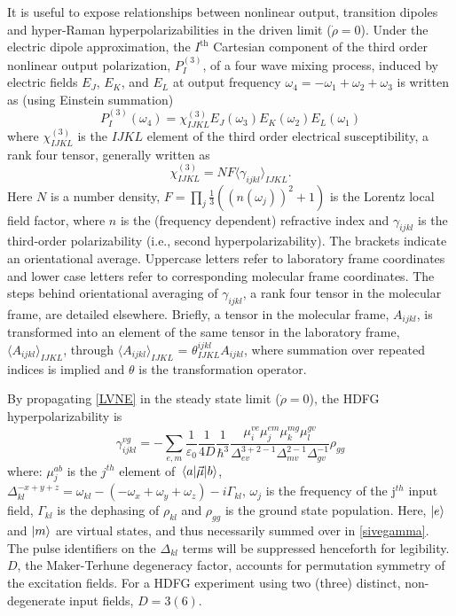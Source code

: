 \documentclass[aip, jcp, reprint, onecolumn, nofootinbib]{revtex4-2}
\begin{document}
It is useful to expose relationships between nonlinear output, transition dipoles and hyper-Raman hyperpolarizabilities in the driven limit ($\dot{\rho} = 0$). \cite{Simpson2004, Moad2005}
Under the electric dipole approximation, the $I^\text{th}$ Cartesian component of the third order nonlinear output polarization, ${P}^{(3)}_I$, of a four wave mixing process, induced by electric fields $E_J$, $E_K$, and $E_L$ at output frequency $\omega_4=-\omega_1 + \omega_2 + \omega_3$ is written as (using Einstein summation) \cite{RN307}
\begin{equation} \label{polarization}
{P}^{(3)}_I (\omega_4)  = \chi^{(3)}_{IJKL} E_J(\omega_3) E_K(\omega_2) E_L(\omega_1) 
\end{equation}
where $\chi^{(3)}_{IJKL}$ is the $IJKL$ element of the third order electrical susceptibility, a rank four tensor, generally written as
\begin{equation}\label{eq:nfgamma}
	\chi^{(3)}_{IJKL} = NF \langle \gamma_{ijkl} \rangle_{IJKL}.
\end{equation}
Here $N$ is a number density, $F=\prod_j  \frac{1}{3} \left({\left(n(\omega_j)\right)^2 + 1} \right)$ is the Lorentz local field factor, where $n$ is the (frequency dependent) refractive index and $\gamma_{ijkl}$ is the third-order polarizability (i.e., second hyperpolarizability). \cite{Bedeaux1973}
The brackets indicate an orientational average.\cite{Andrews1977}
Uppercase letters refer to laboratory frame coordinates and lower case letters refer to corresponding molecular frame coordinates.
The steps behind orientational averaging of $\gamma_{ijkl}$, a rank four tensor in the molecular frame, are detailed elsewhere.\cite{Andrews1977, McDonnell2024}
Briefly, a tensor in the molecular frame, $A_{ijkl}$, is transformed into an element of the same tensor in the laboratory frame, $\langle A_{ijkl} \rangle_{IJKL}$, through $\langle A_{ijkl} \rangle_{IJKL}$ = $\theta^{ijkl}_{IJKL} A_{ijkl}$, where summation over repeated indices is implied and $\theta$ is the transformation operator. \cite{McDonnell2024, Andrews1977}

By propagating \autoref{LVNE} in the steady state limit ($\dot{\rho} = 0$), the HDFG hyperpolarizability is \cite{Prior1984}
\begin{equation}\label{sivegamma}
		\gamma_{ijkl}^{vg} =	- \sum_{e,m} \frac{1}{\varepsilon_0} \frac{1}{4D} \frac{1}{\hbar^3} \frac{\mu^{ve}_{i} \mu^{em}_{j} \mu^{mg}_{k} \mu^{gv}_{l} }{\Delta_{ev}^{3+2-1} \Delta_{mv}^{2-1}\Delta_{gv}^{-1}}  \rho_{gg}
\end{equation}
where: $\mu^{ab}_{j}$ is the $j^{th}$ element of $\mel{a}{\vec{\mu}}{b}$, $\Delta_{kl}^{-x+y+z} = \omega_{kl} - (-\omega_{x}+\omega_{y} + \omega_{z}) - i\Gamma_{kl}$, $\omega_j$ is the frequency of the j$^{th}$ input field, $\Gamma_{kl}$ is the dephasing of $\rho_{kl}$ and $\rho_{gg}$ is the ground state population.
Here, $\ket{e}$ and $\ket{m}$ are virtual states, and thus necessarily summed over in \autoref{sivegamma}.
The pulse identifiers on the $\Delta_{kl}$ terms will be suppressed henceforth for legibility.
$D$, the Maker-Terhune degeneracy factor, accounts for permutation symmetry of the excitation fields.\cite{RN134} 
For a HDFG experiment using two (three) distinct, non-degenerate input fields, $D = 3 (6)$.
\end{document}
